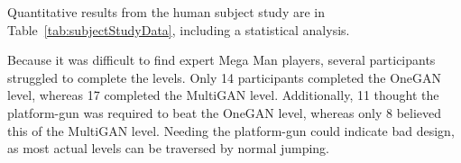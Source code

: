 
Quantitative results from the human subject study are in Table~\ref{tab:subjectStudyData}, including a statistical analysis.

Because it was difficult to find expert Mega Man players, several participants struggled to complete the levels.
Only 14 participants completed the OneGAN level, whereas 17 completed the MultiGAN level. Additionally, 11 thought the platform-gun was required to beat the OneGAN level, whereas only 8 believed this of the MultiGAN level. Needing the platform-gun could indicate bad design, as most actual levels can be traversed by normal jumping.






